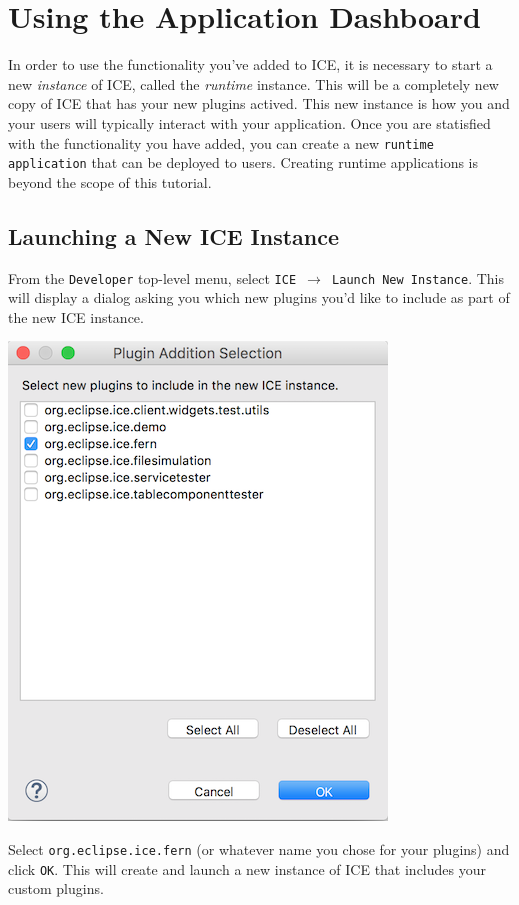 \section{Using the Application Dashboard} 

In order to use the functionality you've added to ICE, it is necessary to start
a new \textit{instance} of ICE, called the \textit{runtime} instance. This will
be a completely new copy of ICE that has your new plugins actived. This new
instance is how you and your users will typically interact with your
application. Once you are statisfied with the functionality you have added, you
can create a new \texttt{runtime application} that can be deployed to users.
Creating runtime applications is beyond the scope of this tutorial.

\subsection{Launching a New ICE Instance}

From the \texttt{Developer} top-level menu, select \texttt{ICE $\rightarrow$ Launch New Instance}. This will display a
dialog asking you which new plugins you'd like to include as part of the new ICE instance. 
\begin{center} \includegraphics{figures/pluginDialog}
\end{center}
Select \texttt{org.eclipse.ice.fern} (or whatever name you chose for your
plugins) and click \texttt{OK}.
This will create and launch a new instance of ICE that includes your custom
plugins.


